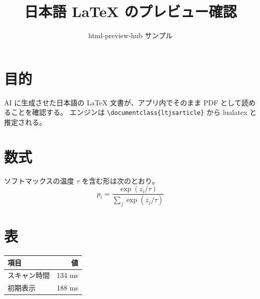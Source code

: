 \documentclass[11pt]{ltjsarticle}
\title{日本語 LaTeX のプレビュー確認}
\author{html-preview-hub サンプル}
\date{}
\begin{document}
\maketitle

\section{目的}
AI に生成させた日本語の \LaTeX{} 文書が、アプリ内でそのまま PDF として読めることを確認する。
エンジンは \verb|\documentclass{ltjsarticle}| から lualatex と推定される。

\section{数式}
ソフトマックスの温度 $\tau$ を含む形は次のとおり。
\begin{equation}
  p_i = \frac{\exp(z_i / \tau)}{\sum_j \exp(z_j / \tau)}
\end{equation}

\section{表}
\begin{center}
\begin{tabular}{lr}
  \hline
  項目 & 値 \\
  \hline
  スキャン時間 & 134 ms \\
  初期表示 & 188 ms \\
  \hline
\end{tabular}
\end{center}
\end{document}
